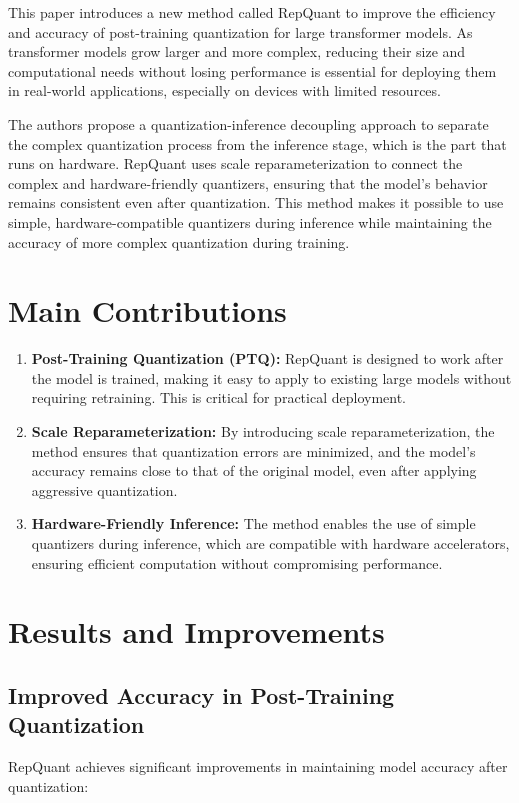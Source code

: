 \documentclass{report}
\begin{document}
	This paper introduces a new method called RepQuant to improve the efficiency and accuracy of post-training quantization for large transformer models. As transformer models grow larger and more complex, reducing their size and computational needs without losing performance is essential for deploying them in real-world applications, especially on devices with limited resources.
	
	The authors propose a quantization-inference decoupling approach to separate the complex quantization process from the inference stage, which is the part that runs on hardware. RepQuant uses scale reparameterization to connect the complex and hardware-friendly quantizers, ensuring that the model’s behavior remains consistent even after quantization. This method makes it possible to use simple, hardware-compatible quantizers during inference while maintaining the accuracy of more complex quantization during training.
	
	\section{Main Contributions}
	\begin{enumerate}
		\item 
		\textbf{Post-Training Quantization (PTQ):} RepQuant is designed to work after the model is trained, making it easy to apply to existing large models without requiring retraining. This is critical for practical deployment.
		
		\item 
		\textbf{Scale Reparameterization:} By introducing scale reparameterization, the method ensures that quantization errors are minimized, and the model's accuracy remains close to that of the original model, even after applying aggressive quantization.
		
		\item 
		\textbf{Hardware-Friendly Inference:} The method enables the use of simple quantizers during inference, which are compatible with hardware accelerators, ensuring efficient computation without compromising performance.
	\end{enumerate}
	
	
	\section{Results and Improvements}
	\subsection{Improved Accuracy in Post-Training Quantization}
	RepQuant achieves significant improvements in maintaining model accuracy after quantization:
	
\end{document}
